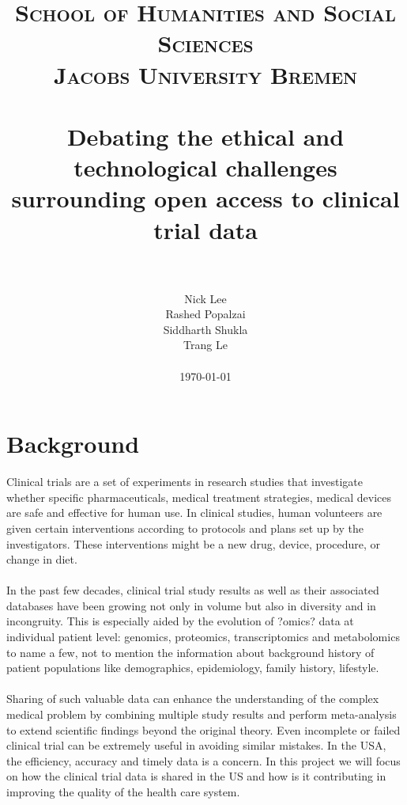 \documentclass[paper=a4, fontsize=12pt]{article}
\title{
		\vspace{-1in} 	
		\usefont{OT1}{bch}{b}{n}
		\normalfont \normalsize \textsc{School of Humanities and Social Sciences\\Jacobs University Bremen} \\ [25pt]
		\horrule{0.5pt} \\[0.4cm]
		\huge Debating the ethical and technological challenges surrounding open access to clinical trial data\\
		\horrule{2pt} \\[0.5cm]
}
\author{Nick Lee\\Rashed Popalzai\\Siddharth Shukla\\Trang Le\\\\\today}
\date{}
\begin{document}
\maketitle
\newpage
{}


\section*{Background}
Clinical trials are a set of experiments in research studies that investigate whether specific pharmaceuticals, medical treatment strategies, medical devices are safe and effective for human use. In clinical studies, human volunteers are given certain interventions according to protocols and plans set up by the investigators. These interventions might be a new drug, device, procedure, or change in diet. \\\\
In the past few decades, clinical trial study results as well as their associated databases have been growing not only in volume but also in diversity and in incongruity. This is especially aided by the evolution of ?omics? data at individual patient level: genomics, proteomics, transcriptomics and metabolomics to name a few, not to mention the information about background history of patient populations like demographics, epidemiology, family history, lifestyle.\\\\
Sharing of such valuable data can enhance the understanding of the complex medical problem by combining multiple study results and perform meta-analysis to extend scientific findings beyond the original theory. Even incomplete or failed clinical trial can be extremely useful in avoiding similar mistakes. In the USA, the efficiency, accuracy and timely data is a concern. In this project we will focus on how the clinical trial data is shared in the US and how is it contributing in improving the quality of the health care system.
\end{document}
